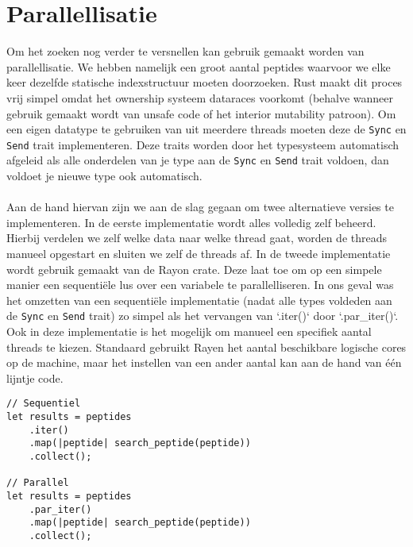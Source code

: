 \section{Parallellisatie}\label{sec:parallellisatie}
Om het zoeken nog verder te versnellen kan gebruik gemaakt worden van parallellisatie.
We hebben namelijk een groot aantal peptides waarvoor we elke keer dezelfde statische indexstructuur moeten doorzoeken.
Rust maakt dit proces vrij simpel omdat het ownership systeem dataraces voorkomt (behalve wanneer gebruik gemaakt wordt van unsafe code of het interior mutability patroon)\cite{rust_data_races}.
Om een eigen datatype te gebruiken van uit meerdere threads moeten deze de \texttt{Sync} en \texttt{Send} trait implementeren.
Deze traits worden door het typesysteem automatisch afgeleid als alle onderdelen van je type aan de \texttt{Sync} en \texttt{Send} trait voldoen, dan voldoet je nieuwe type ook automatisch. %
\\ \\
Aan de hand hiervan zijn we aan de slag gegaan om twee alternatieve versies te implementeren.
In de eerste implementatie wordt alles volledig zelf beheerd.
Hierbij verdelen we zelf welke data naar welke thread gaat, worden de threads manueel opgestart en sluiten we zelf de threads af.
In de tweede implementatie wordt gebruik gemaakt van de Rayon crate\cite{rayon}.
Deze laat toe om op een simpele manier een sequentiële lus over een variabele te parallelliseren.
In ons geval was het omzetten van een sequentiële implementatie (nadat alle types voldeden aan de \texttt{Sync} en \texttt{Send} trait) zo simpel als het vervangen van `.iter()` door `.par\_iter()`.
Ook in deze implementatie is het mogelijk om manueel een specifiek aantal threads te kiezen.
Standaard gebruikt Rayen het aantal beschikbare logische cores op de machine, maar het instellen van een ander aantal kan aan de hand van één lijntje code.

\begin{verbatim}
// Sequentiel
let results = peptides
    .iter()
    .map(|peptide| search_peptide(peptide))
    .collect();

// Parallel
let results = peptides
    .par_iter()
    .map(|peptide| search_peptide(peptide))
    .collect();
\end{verbatim}

